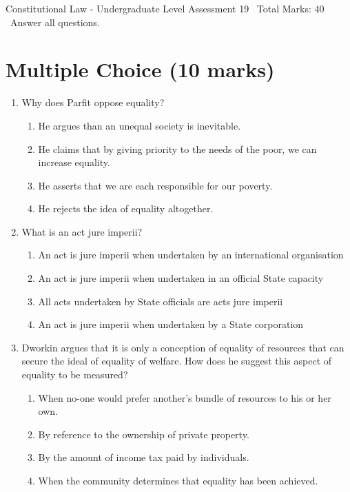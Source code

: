 \documentclass[12pt]{article}
\begin{document}
\begin{center}
Constitutional Law - Undergraduate Level Assessment 19 \
Total Marks: 40 \
Answer all questions.
\end{center}

\section*{Multiple Choice (10 marks)}
\begin{enumerate}[label=\arabic*.]
\item Why does Parfit oppose equality?
\begin{enumerate}[label=(\alph*)]
    \item He argues than an unequal society is inevitable.
    \item He claims that by giving priority to the needs of the poor, we can increase equality.
    \item He asserts that we are each responsible for our poverty.
    \item He rejects the idea of equality altogether.
\end{enumerate}
\item What is an act jure imperii?
\begin{enumerate}[label=(\alph*)]
    \item An act is jure imperii when undertaken by an international organisation
    \item An act is jure imperii when undertaken in an official State capacity
    \item All acts undertaken by State officials are acts jure imperii
    \item An act is jure imperii when undertaken by a State corporation
\end{enumerate}
\item Dworkin argues that it is only a conception of equality of resources that can secure the ideal of equality of welfare. How does he suggest this aspect of equality to be measured?
\begin{enumerate}[label=(\alph*)]
    \item When no-one would prefer another's bundle of resources to his or her own.
    \item By reference to the ownership of private property.
    \item By the amount of income tax paid by individuals.
    \item When the community determines that equality has been achieved.
\end{enumerate}

\end{enumerate}
\end{document}
